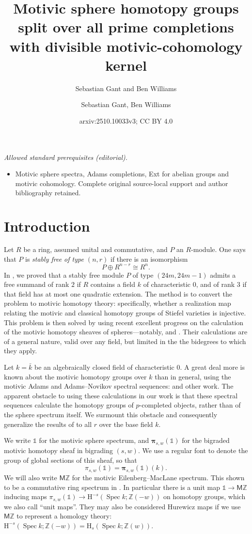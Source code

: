 \documentclass[11pt, oneside, dvipsnames, svgnames, table, final]{amsart}
\author{Sebastian Gant and Ben Williams}
\title{Motivic sphere homotopy groups split over all prime completions with divisible motivic-cohomology kernel}
\author{Sebastian Gant, Ben Williams}
\date{arxiv:2510.10033v3; CC BY 4.0}
\newcommand{\mathbx}[1]{\mathbb{#1}}
\theoremstyle{plain}
\theoremstyle{definition}
\theoremstyle{remark}
\newcommand{\Z}{\mathbx{Z}}
\newcommand{\spec}{\operatorname{Spec}}
\newcommand{\Spec}{\spec}
\newcommand{\Hoh}{\mathrm{H}}
\newcommand{\isom}{\cong}
\newcommand{\iso}{\isom}
\newcommand{\bpi}{\bm{\pi}}
\newcommand{\<}[1]{{\langle}#1 {\rangle}}
\newcommand{\MZ}{\mathsf{M}\Z}
\newcommand{\one}{\mathbb{1}}
\begin{document}
\maketitle
\noindent\textit{Allowed standard prerequisites (editorial).}\begin{itemize}
\item Motivic sphere spectra, Adams completions, Ext for abelian groups and motivic cohomology. Complete original source-local support and author bibliography retained.
\end{itemize}\medskip
\section{Introduction}
\label{sec:introduction}

Let $R$ be a ring, assumed unital and commutative, and $P$ an $R$-module. One says that $P$ is \emph{stably free of type $(n,r)$} if there is an isomorphism
\[ P \oplus R^{n-r} \iso R^n. \]
In \cite{Gant2025}, we proved that a stably free module $P$ of type $(24m,24m-1)$ admits a free summand of rank $2$ if $R$ contains a field $k$ of characteristic $0$, and of rank $3$ if that field has at most one quadratic extension. The method is to convert the problem to motivic homotopy theory: specifically, whether a realization map relating the motivic and classical homotopy groups of Stiefel varieties is injective. This problem is then solved by using recent excellent progress on the calculation of the motivic homotopy sheaves of spheres---notably, \cite{Rondigs2019} and \cite{Rondigs2024}. Their calculations are of a general nature, valid over any field, but limited in the the bidegrees to which they apply.

Let $k=\bar k$ be an algebraically closed field of characteristic $0$. A great deal more is known about the motivic homotopy groups over $k$ than in general, using the motivic Adams and Adams--Novikov spectral sequences: \cite{Dugger2010, Isaksen2019, Isaksen2022, Isaksen2020, Stahn2021} and other work. The apparent obstacle to using these calculations in our work is that these spectral sequences calculate the homotopy groups of $p$-completed objects, rather than of the sphere spectrum itself. We surmount this obstacle and consequently generalize the results of \cite{Gant2025} to all $r$ over the base field $k$.

We write $\one$ for the motivic sphere spectrum, and $\bpi_{s,w}(\one)$ for the bigraded motivic homotopy sheaf in bigrading $(s,w)$. We use a regular font to denote the group of global sections of this sheaf, so that
\[ \pi_{s,w}(\one) = \bpi_{s,w}(\one)(k).\]
We will also write $\MZ$ for the motivic Eilenberg--MacLane spectrum. This shown to be a commutative ring spectrum in  \cite[Example 3.4]{Dundas2003}. In particular there is a unit map $\one \to \MZ$ inducing maps $\pi_{s,w}(\one) \to \Hoh^{-s}(\Spec k; \Z(-w))$ on homotopy groups, which we also call ``unit maps''. They may also be considered Hurewicz maps if we use $\MZ$ to represent a homology theory: $\Hoh^{-s}(\Spec k; \Z(-w)) = \Hoh_{s}(\Spec k ; \Z(w))$.
\end{document}

